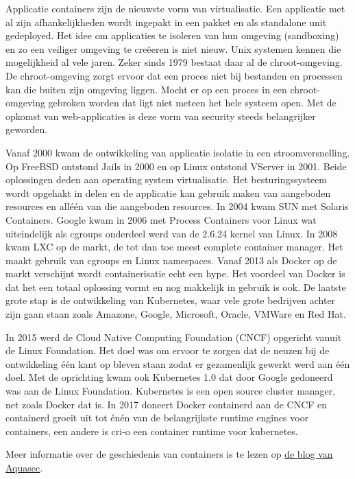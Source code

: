 Applicatie containers zijn de nieuwste vorm van virtualisatie. Een applicatie met al zijn afhankelijkheden wordt ingepakt in een pakket en als standalone unit gedeployed. Het idee om applicaties te isoleren van hun omgeving (sandboxing) en zo een veiliger omgeving te cre\"eeren is niet nieuw. Unix systemen kennen die mogelijkheid al vele jaren. Zeker sinds 1979 bestaat daar al de chroot-omgeving. De chroot-omgeving zorgt ervoor dat een proces niet bij bestanden en processen kan die buiten zijn omgeving liggen. Mocht er op een proces in een chroot-omgeving gebroken worden dat ligt niet meteen het hele systeem open. Met de opkomst van web-applicaties is deze vorm van security steeds belangrijker geworden.

Vanaf 2000 kwam de ontwikkeling van applicatie isolatie in een stroomversnelling. Op FreeBSD ontstond Jails in 2000 en op Linux ontstond VServer in 2001. Beide oplossingen deden aan operating system virtualisatie. Het besturingssysteem wordt opgehakt in delen en de applicatie kan gebruik maken van aangeboden resources en all\'e\'en van die aangeboden resources. In 2004 kwam SUN met Solaris Containers. Google kwam in 2006 met Process Containers voor Linux wat uiteindelijk als cgroups onderdeel werd van de 2.6.24 kernel van Linux. In 2008 kwam LXC op de markt, de tot dan toe meest complete container manager. Het maakt gebruik van cgroups en Linux namespaces. Vanaf 2013 als Docker op de markt verschijnt wordt containerisatie echt een hype. Het voordeel van Docker is dat het een totaal oplossing vormt en nog makkelijk in gebruik is ook. De laatste grote stap is de ontwikkeling van Kubernetes, waar vele grote bedrijven achter zijn gaan staan zoals Amazone, Google, Microsoft, Oracle, VMWare en Red Hat.

In 2015 werd de Cloud Native Computing Foundation (CNCF) opgericht vanuit de Linux Foundation. Het doel was om ervoor te zorgen dat de neuzen bij de ontwikkeling \'e\'en kant op bleven staan zodat er gezamenlijk gewerkt werd aan \'e\'en doel. Met de oprichting kwam ook Kubernetes 1.0 dat door Google gedoneerd was aan de Linux Foundation. Kubernetes is een open source cluster manager, net zoals Docker dat is. In 2017 doneert Docker containerd aan de CNCF en containerd groeit uit tot \'en\'en van de belangrijkste runtime engines voor containers, een andere is cri-o een container runtime voor kubernetes.

Meer informatie over de geschiedenis van containers is te lezen op \href{https://blog.aquasec.com/a-brief-history-of-containers-from-1970s-chroot-to-docker-2016}{de blog van Aquasec}.
